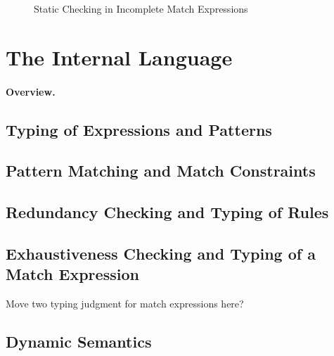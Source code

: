 \documentclass[runningheads,envcountsame,a4paper]{llncs}
\begin{document}
\begin{figure}[ht]
  \centering
  \hspace*{\fill}%
  \hfill%
  \hspace*{\fill}%
  \caption{Static Checking in Incomplete Match Expressions}
  \label{fig:exh-red-hole}
\end{figure}

\section{The Internal Language}


\paragraph{Overview.}
\subsection{Typing of Expressions and Patterns}


\subsection{Pattern Matching and Match Constraints}




\subsection{Redundancy Checking and Typing of Rules}


\subsection{Exhaustiveness Checking and Typing of a Match Expression}
Move two typing judgment for match expressions here?
\subsection{Dynamic Semantics}


\clearpage



\end{document}
